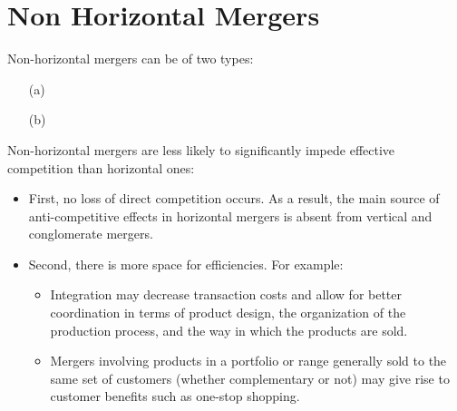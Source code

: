
\section{Non Horizontal Mergers}

    Non-horizontal mergers can be of two types:
    \begin{itemize}
        \item[(a)]

            
        \item[(b)]

        
    \end{itemize}

    \noindent
    Non-horizontal mergers are less likely to significantly impede effective competition than horizontal ones:
    \begin{itemize}
        \item First, no loss of direct competition occurs. As a result, the main source of anti-competitive effects in horizontal mergers is absent from vertical and conglomerate mergers.
        \item Second, there is more space for efficiencies. For example:
        \begin{itemize}
            \item Integration may decrease transaction costs and allow for better coordination in terms of product design, the organization of the production process, and the way in which the products are sold.
            \item Mergers involving products in a portfolio or range generally sold to the same set of customers (whether complementary or not) may give rise to customer benefits such as one-stop shopping.
        \end{itemize}
    \end{itemize}

